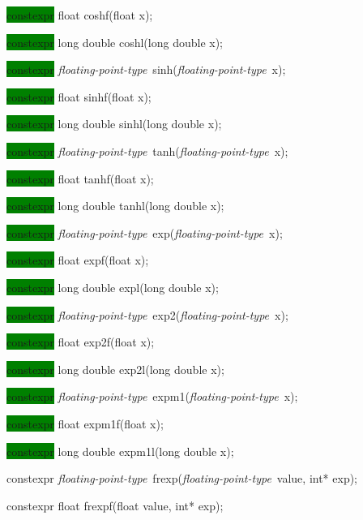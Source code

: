 \documentclass[prd,twocolumn,amsmath,amssymb,nofootinbib,eqsecnum]{revtex4-1}
\newcommand{\highlight}[1]{\colorbox{green}{\!\!\!\! #1}}
\newcommand{\oldhighlight}[1]{#1}
\newcommand{\fptype}{{\it floating-point-type}}
\begin{document}
{\highlight{constexpr} float coshf(float x);

\highlight{constexpr} long double coshl(long double x);

\vspace{2ex}


\highlight{constexpr} \fptype\ sinh(\fptype\ x);

\highlight{constexpr} float sinhf(float x);

\highlight{constexpr} long double sinhl(long double x);

\vspace{2ex}


\highlight{constexpr} \fptype\ tanh(\fptype\ x);

\highlight{constexpr} float tanhf(float x);

\highlight{constexpr} long double tanhl(long double x);

\vspace{2ex}


\highlight{constexpr} \fptype\ exp(\fptype\ x);

\highlight{constexpr} float expf(float x);

\highlight{constexpr} long double expl(long double x);

\vspace{2ex}


\highlight{constexpr} \fptype\ exp2(\fptype\ x);

\highlight{constexpr} float exp2f(float x);

\highlight{constexpr} long double exp2l(long double x);

\vspace{2ex}


\highlight{constexpr} \fptype\ expm1(\fptype\ x);

\highlight{constexpr} float expm1f(float x);

\highlight{constexpr} long double expm1l(long double x);

\vspace{2ex}


\oldhighlight{constexpr} \fptype\ frexp(\fptype\ value, int* exp);

\oldhighlight{constexpr}  float frexpf(float value, int* exp);

}
\end{document}
